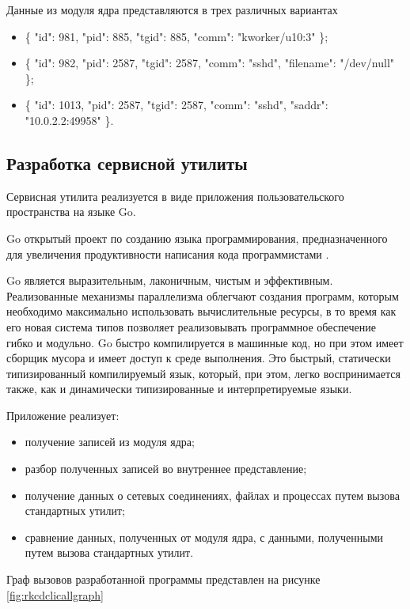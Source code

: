\documentclass{gost7.32-2001}
\begin{document}
Данные из модуля ядра представляются в трех различных вариантах
\begin{itemize}
\item
  \{ "id": 981, "pid": 885, "tgid": 885, "comm": "kworker/u10:3" \};
\item
  \{ "id": 982, "pid": 2587, "tgid": 2587, "comm": "sshd", "filename":
    "/dev/null" \};
\item
  \{ "id": 1013, "pid": 2587, "tgid": 2587, "comm": "sshd", "saddr":
  "10.0.2.2:49958" \}.
\end{itemize}

\subsection{Разработка сервисной утилиты}


Сервисная утилита реализуется в виде приложения пользовательского
пространства на языке Go.

Go \dash открытый проект по созданию языка программирования,
предназначенного для увеличения продуктивности написания кода
программистами .

Go является выразительным, лаконичным, чистым и
эффективным. Реализованные механизмы параллелизма облегчают создания
программ, которым необходимо максимально использовать вычислительные
ресурсы, в то время как его новая система типов позволяет
реализовывать программное обеспечение гибко и модульно. Go быстро
компилируется в машинные код, но при этом имеет сборщик мусора и
имеет доступ к среде выполнения. Это быстрый, статически
типизированный компилируемый язык, который, при этом, легко
воспринимается также, как и динамически типизированные и
интерпретируемые языки.

\newpage
Приложение реализует:
\begin{itemize}
\item
  получение записей из модуля ядра;
\item
  разбор полученных записей во внутреннее представление;
\item
  получение данных о сетевых соединениях, файлах и процессах путем
  вызова стандартных утилит;
\item
  сравнение данных, полученных от модуля ядра, с данными, полученными
  путем вызова стандартных утилит.
\end{itemize}

Граф вызовов разработанной программы представлен на рисунке
\ref{fig:rkcdclicallgraph}
\end{document}
